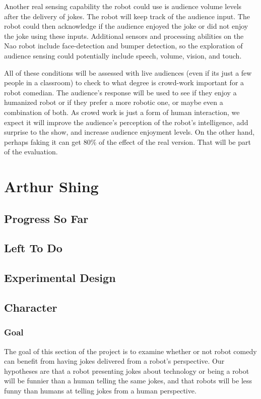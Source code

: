 \documentclass[onecolumn, draftclsnofoot,10pt, compsoc]{IEEEtran}
\begin{document}
Another real sensing capability the robot could use is  audience volume levels after the delivery of jokes. The robot will keep track of the audience input. The robot could then acknowledge if the audience enjoyed the joke or did not enjoy the joke using these inputs. Additional sensors and processing abilities on the Nao robot include face-detection and bumper detection, so the exploration of audience sensing could potentially include speech, volume, vision, and touch.

All of these conditions will be assessed with live audiences (even if its just a few people in a classroom) to check to what degree is crowd-work important for a robot comedian. The audience's response will be used to see if they enjoy a humanized robot or if they prefer a more robotic one, or maybe even a combination of both. As crowd work is just a form of human interaction, we expect it will improve the audience's perception of the robot's intelligence, add surprise to the show, and increase audience enjoyment levels. On the other hand, perhaps faking it can get 80\% of the effect of the real version. That will be part of the evaluation.

\section{Arthur Shing}
\subsection{Progress So Far}
\subsection{Left To Do}
\subsection{Experimental Design}
\subsection{Character}
\subsubsection{Goal}
The goal of this section of the project is to examine whether or not robot comedy can benefit from having jokes delivered from a robot's perspective. Our hypotheses are that a robot presenting jokes about technology or being a robot will be funnier than a human telling the same jokes, and that robots will be less funny than humans at telling jokes from a human perspective.
\end{document}
